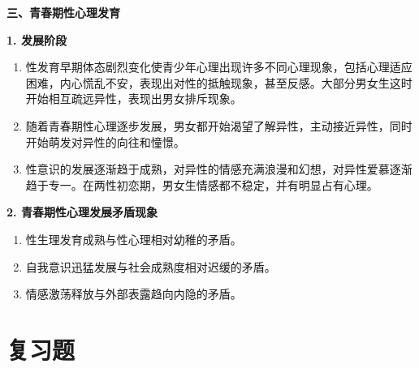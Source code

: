 \begin{defbox}
\textbf{三、青春期性心理发育}

\textbf{1. 发展阶段}
\begin{enumerate}[leftmargin=*]
    \item {}性发育早期体态剧烈变化使青少年心理出现许多不同心理现象，包括心理适应困难，内心慌乱不安，表现出对性的抵触现象，甚至反感。大部分男女生这时开始相互疏远异性，表现出男女排斥现象。
    \item {}随着青春期性心理逐步发展，男女都开始渴望了解异性，主动接近异性，同时开始萌发对异性的向往和憧憬。
    \item {}性意识的发展逐渐趋于成熟，对异性的情感充满浪漫和幻想，对异性爱慕逐渐趋于专一。在两性初恋期，男女生情感都不稳定，并有明显占有心理。
\end{enumerate}

\textbf{2. 青春期性心理发展矛盾现象}
\begin{enumerate}[leftmargin=*]
    \item 性生理发育成熟与性心理相对幼稚的矛盾。
    \item 自我意识迅猛发展与社会成熟度相对迟缓的矛盾。
    \item 情感激荡释放与外部表露趋向内隐的矛盾。
\end{enumerate}

\vspace{3pt}
\begin{center}
\end{center}
\vspace{3pt}
\end{defbox}

\section{复习题}

